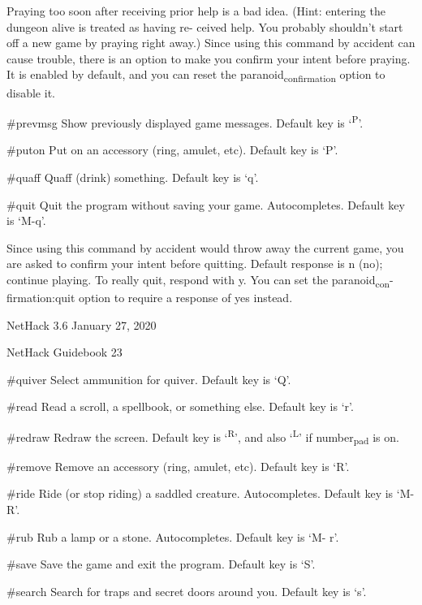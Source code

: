 \documentclass[11pt]{article}
\begin{document}
Praying too soon after receiving prior help is a bad idea.
(Hint: entering the dungeon alive is treated as having re-
ceived help. You probably shouldn't start off a new game by
praying right away.) Since using this command by accident
can cause trouble, there is an option to make you confirm
your intent before praying. It is enabled by default, and
you can reset the paranoid\textsubscript{confirmation} option to disable
it.

\#prevmsg
   Show previously displayed game messages.  Default key is
   `\textsuperscript{P}'.

\#puton
   Put on an accessory (ring, amulet, etc). Default key is
   `P'.

\#quaff
   Quaff (drink) something. Default key is `q'.

\#quit
   Quit the program without saving your game.  Autocompletes.
   Default key is `M-q'.

Since using this command by accident would throw away the
current game, you are asked to confirm your intent before
quitting. Default response is n (no); continue playing. To
really quit, respond with y. You can set the paranoid\textsubscript{con}-
firmation:quit option to require a response of yes instead.




NetHack 3.6                   January 27, 2020





NetHack Guidebook                       23



\#quiver
   Select ammunition for quiver. Default key is `Q'.

\#read
   Read a scroll, a spellbook, or something else. Default key
   is `r'.

\#redraw
   Redraw the screen. Default key is `\textsuperscript{R}', and also `\textsuperscript{L}' if
   number\textsubscript{pad} is on.

\#remove
   Remove an accessory (ring, amulet, etc). Default key is
   `R'.

\#ride
   Ride (or stop riding) a saddled creature.  Autocompletes.
   Default key is `M-R'.

\#rub
   Rub a lamp or a stone. Autocompletes. Default key is `M-
   r'.

\#save
   Save the game and exit the program. Default key is `S'.

\#search
   Search for traps and secret doors around you.  Default key
   is `s'.
\end{document}
